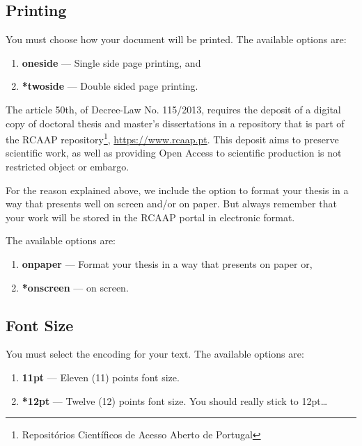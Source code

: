 \subsection{Printing} %
\label{sub:printing}

You must choose how your document will be printed. The available options are:

\begin{enumerate}
\item \textbf{oneside} --- Single side page printing, and
\item \textbf{*twoside} --- Double sided page printing.
\end{enumerate}

The article 50th, of Decree-Law No. 115/2013, requires the deposit of a digital copy of doctoral thesis and master's dissertations in a repository that is part of the RCAAP  repository\footnote{Repositórios Científicos de Acesso Aberto de Portugal}, \url{https://www.rcaap.pt}.  This deposit aims to preserve scientific work, as well as providing Open Access to scientific production is not restricted object or embargo.

For the reason explained above, we include the option to format your thesis in a way that presents well on screen and/or on paper.   But always remember that your work will be stored in the RCAAP portal in electronic format.

The available options are:

\begin{enumerate}
\item \textbf{onpaper} --- Format your thesis in a way that presents on paper or,
\item \textbf{*onscreen} --- on screen.
\end{enumerate}

\subsection{Font Size} %
\label{ssec:font_size}

You must select the encoding for your text. The available options are:
\begin{enumerate}
	\item \textbf{11pt} --- Eleven (11) points font size.
	\item \textbf{*12pt} --- Twelve (12) points font size. You should really stick to 12pt\ldots
\end{enumerate}

